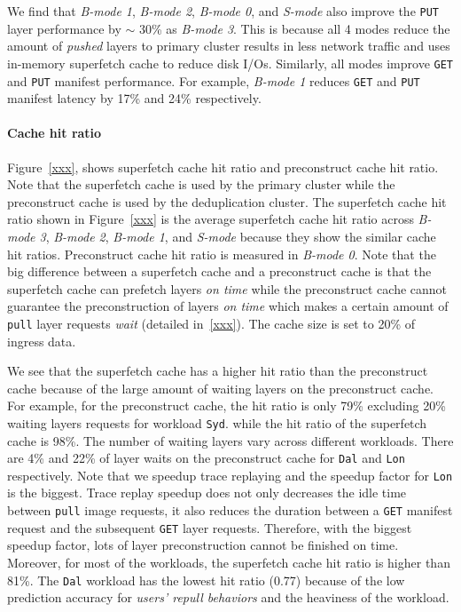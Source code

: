 We find that
\emph{B-mode 1}, \emph{B-mode 2}, \emph{B-mode 0}, and \emph{S-mode}
 also improve the \texttt{PUT} layer performance by $\sim$ 30\% as \emph{B-mode 3}.
This is because
all 4 modes reduce the amount of \emph{pushed} layers to primary cluster results in
less network traffic and uses in-memory superfetch cache to reduce disk I/Os.
Similarly,
all modes improve \texttt{GET} and \texttt{PUT} manifest performance.
For example, \emph{B-mode 1} reduces \texttt{GET} and \texttt{PUT}
manifest latency by 17\% and 24\% respectively.

\paragraph{Cache hit ratio}

Figure~\ref{xxx},
shows superfetch cache hit ratio and preconstruct cache hit ratio.
Note that the superfetch cache is used by the primary cluster while the preconstruct cache is used by the deduplication cluster.
The superfetch cache hit ratio shown in Figure~\ref{xxx} is the average superfetch cache hit ratio across \emph{B-mode 3}, \emph{B-mode 2}, \emph{B-mode 1}, and \emph{S-mode} because they show the similar cache hit ratios.
Preconstruct cache hit ratio is measured in \emph{B-mode 0}.
Note that the big difference between a superfetch cache and a preconstruct cache is that the superfetch cache can prefetch layers \emph{on time} while the preconstruct cache cannot guarantee the preconstruction of layers \emph{on time} which makes a certain amount of \texttt{pull} layer requests \emph{wait} (detailed in~\ref{xxx}).
The cache size is set to 20\% of ingress data.

We see that the superfetch cache has a higher hit ratio than the preconstruct cache
because of the large amount of waiting layers on the preconstruct cache.
For example, for the preconstruct cache, 
the hit ratio is only 79\% excluding 20\% waiting layers requests for workload \texttt{Syd}.
while the hit ratio of the superfetch cache is 98\%.
The number of waiting layers vary across different workloads.
There are 4\% and 22\% of layer waits on the preconstruct cache for \texttt{Dal} and \texttt{Lon} respectively. 
Note that we speedup trace replaying
and the speedup factor for \texttt{Lon} is the biggest.
Trace replay speedup does not only decreases the idle time between \texttt{pull} image requests, it also reduces the duration between a \texttt{GET} manifest request and the subsequent \texttt{GET} layer requests.
Therefore, with the biggest speedup factor,
lots of layer preconstruction cannot be finished on time.
Moreover, for most of the workloads, the superfetch cache hit ratio is higher than 81\%. 
The \texttt{Dal} workload has the lowest hit ratio (0.77) because of the low prediction accuracy for \emph{users' repull behaviors} 
and the heaviness of the workload.

